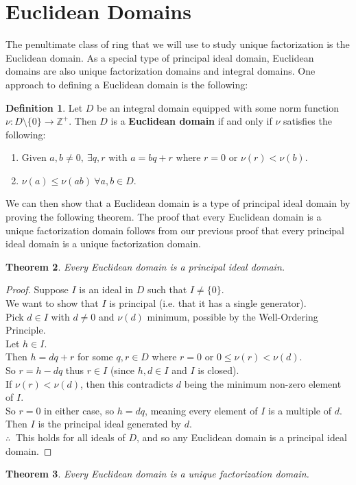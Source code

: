 \documentclass[11pt]{amsart}
\newtheorem{theorem}{Theorem}[section]
\theoremstyle{definition}
\newtheorem{definition}[theorem]{Definition}
\newcommand{\integers}{\mathbb{Z}}
\begin{document}
\section{Euclidean Domains}
The penultimate class of ring that we will use to study unique factorization is the Euclidean domain. As a special type of principal ideal domain,
Euclidean domains are also unique factorization domains and integral domains. One approach to defining a Euclidean domain is the following:
\begin{definition}
	Let $D$ be an integral domain equipped with some norm function $\nu: D \setminus \{ 0 \} \to \integers^{+}$. Then $D$ is a 
	\textbf{Euclidean domain} if and only if $\nu$ satisfies the following:
	\begin{enumerate}
		\item{Given $a, b \neq 0, \: \exists q, r$ with $a = bq + r$ where $r = 0$ or $\nu(r) < \nu(b)$.}
		\item{$\nu(a) \leq \nu(ab) \: \forall a, b \in D$.}
	\end{enumerate}
\end{definition}
We can then show that a Euclidean domain is a type of principal ideal domain by proving the following theorem. The proof that every
Euclidean domain is a unique factorization domain follows from our previous proof that every principal ideal domain is a unique factorization
domain.
\begin{theorem}
	Every Euclidean domain is a principal ideal domain.
\end{theorem}
\begin{proof}
	Suppose $I$ is an ideal in $D$ such that $I \neq \{ 0 \}$. \\
	We want to show that $I$ is principal (i.e. that it has a single generator). \\
	Pick $d \in I$ with $d \neq 0$ and $\nu(d)$ minimum, possible by the Well-Ordering Principle. \\
	Let $h \in I$. \\
	Then $h = dq + r$ for some $q, r \in D$ where $r = 0$ or $0 \leq \nu(r) < \nu(d)$. \\
	So $r = h - dq$ thus $r \in I$ (since $h, d \in I$ and $I$ is closed). \\
	If $\nu(r) < \nu(d)$, then this contradicts $d$ being the minimum non-zero element of $I$. \\
	So $r = 0$ in either case, so $h = dq$, meaning every element of $I$ is a multiple of $d$. \\
	Then $I$ is the principal ideal generated by $d$. \\
	$\therefore \: $  This holds for all ideals of $D$, and so any Euclidean domain is a principal ideal domain.
\end{proof}
\begin{theorem}
	Every Euclidean domain is a unique factorization domain.
\end{theorem}
\newpage
\end{document}
